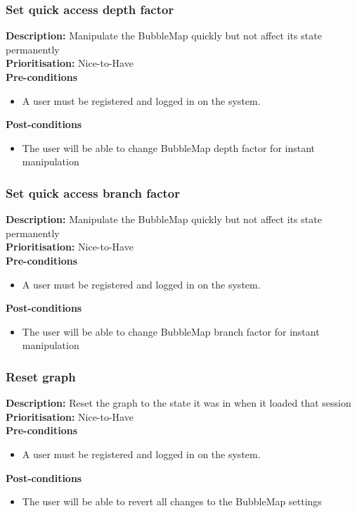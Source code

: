 \documentclass[hidelinks,english]{article}
\begin{document}
    	    \subsubsection{Set quick access depth factor}
				\textbf{Description:}  Manipulate the BubbleMap quickly but not affect its state permanently\\
			    \textbf{Prioritisation:} Nice-to-Have\\
      			\textbf{Pre-conditions}
			    \begin{itemize}
			        \item A user must be registered and logged in on the system.
			    \end{itemize}
    			\textbf{Post-conditions}
			    \begin{itemize}
			    	\item The user will be able to change BubbleMap depth factor for instant manipulation
    			\end{itemize}
    		
    		\subsubsection{Set quick access branch factor}
				\textbf{Description:}  Manipulate the BubbleMap quickly but not affect its state permanently\\
			    \textbf{Prioritisation:} Nice-to-Have\\
      			\textbf{Pre-conditions}
			    \begin{itemize}
			        \item A user must be registered and logged in on the system.
			    \end{itemize}
    			\textbf{Post-conditions}
			    \begin{itemize}
			    	\item The user will be able to change BubbleMap branch factor for instant manipulation
    			\end{itemize}
    		
    		\subsubsection{Reset graph}
				\textbf{Description:} Reset the graph to the state it was in when it loaded that session\\
			    \textbf{Prioritisation:} Nice-to-Have\\
      			\textbf{Pre-conditions}
			    \begin{itemize}
			        \item A user must be registered and logged in on the system.
			    \end{itemize}
    			\textbf{Post-conditions}
			    \begin{itemize}
			    	\item The user will be able to revert all changes to the BubbleMap settings
    			\end{itemize}
    			
\end{document}
